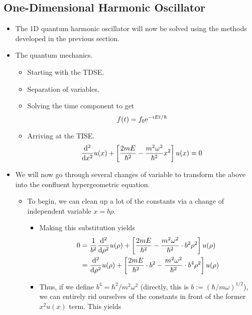 \documentclass[../finalProject.tex]{subfiles}
\begin{document}
\subsection{One-Dimensional Harmonic Oscillator}
\begin{itemize}
    \item The 1D quantum harmonic oscillator will now be solved using the methods developed in the previous section.
    \item The quantum mechanics.
    \begin{itemize}
        \item Starting with the TDSE.
        \item Separation of variables.
        \item Solving the time component to get
        \begin{equation*}
            f(t) = f_0\e[-iEt/\hbar]
        \end{equation*}
        \item Arriving at the TISE.
        \begin{equation*}
            \dv[2]{x}u(x)+\left[ \frac{2mE}{\hbar^2}-\frac{m^2\omega^2}{\hbar^2}x^2 \right]u(x) = 0
        \end{equation*}
    \end{itemize}
    \item We will now go through several changes of variable to transform the above into the confluent hypergeometric equation.
    \begin{itemize}
        \item To begin, we can clean up a lot of the constants via a change of independent variable $x=b\rho$.
        \begin{itemize}
            \item Making this substitution yields
            \begin{align*}
                0 &= \frac{1}{b^2}\dv[2]{\rho}u(\rho)+\left[ \frac{2mE}{\hbar^2}-\frac{m^2\omega^2}{\hbar^2}\cdot b^2\rho^2 \right]u(\rho)\\
                &= \dv[2]{\rho}u(\rho)+\left[ \frac{2mE}{\hbar^2}\cdot b^2-\frac{m^2\omega^2}{\hbar^2}\cdot b^4\rho^2 \right]u(\rho)
            \end{align*}
            \item Thus, if we define $b^4=\hbar^2/m^2\omega^2$ (directly, this is $b:=(\hbar/m\omega)^{1/2}$), we can entirely rid ourselves of the constants in front of the former $x^2u(x)$ term. This yields
            \begin{equation*}

\end{equation*}
\end{itemize}
\end{itemize}
\end{itemize}
\end{document}
